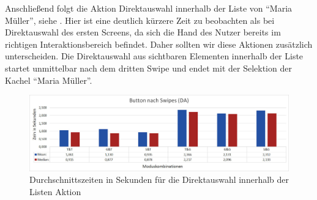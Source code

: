 Anschließend folgt die Aktion Direktauswahl innerhalb der Liste von "`Maria Müller"', siehe . 
Hier ist eine deutlich kürzere Zeit zu beobachten als bei Direktauswahl des ersten Screens, da sich die Hand des Nutzer bereits im richtigen Interaktionsbereich befindet. 
Daher sollten wir diese Aktionen zusätzlich unterscheiden. 
Die Direktauswahl aus sichtbaren Elementen innerhalb der Liste startet unmittelbar nach dem dritten Swipe und endet mit der Selektion der Kachel "`Maria Müller"'.
\begin{figure}[ht]
  \centering
  \includegraphics[width=1\textwidth]{img/DA_Swipe.JPG}
  \caption{Durchschnittszeiten in Sekunden für die Direktauswahl innerhalb der Listen Aktion}
  \label{fig:DA_Swipe}
\end{figure}

